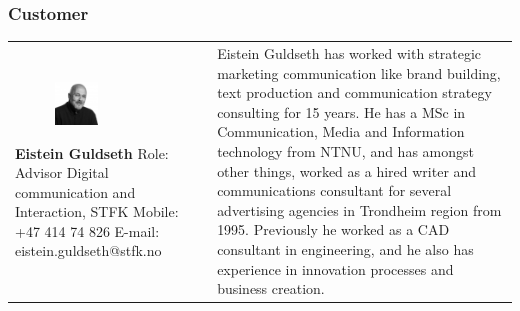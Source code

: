 \documentclass[11pt]{book}
\begin{document}
\subsubsection{Customer}
\begin{table}[H]
\centering
\begin{tabular}{ p{7cm} p{7cm} }
\parbox{7cm}{
\begin{figure}[H]
      \includegraphics[width=0.4\textwidth]{Figures/eisteinGuldseth.jpeg}
      \label{fig:partners_customer_eistein}
\end{figure}
\textbf{Eistein Guldseth}\\
Role: Advisor Digital communication and Interaction, STFK\\
Mobile: +47 414 74 826\\
E-mail: eistein.guldseth@stfk.no} & \parbox{7cm}{
Eistein Guldseth has worked with strategic marketing communication like brand building, text production and communication strategy consulting for 15 years. He has a MSc in Communication, Media and Information technology from NTNU, and has amongst other things, worked as a hired writer and communications consultant for several advertising agencies in Trondheim region from 1995. Previously he worked as a CAD consultant in engineering, and he also has experience in innovation processes and business creation.\cite{bioEisteinGuldseth}
}
\end{tabular}
\label{tab:partners_customer_eistein}
\end{table}
\end{document}
